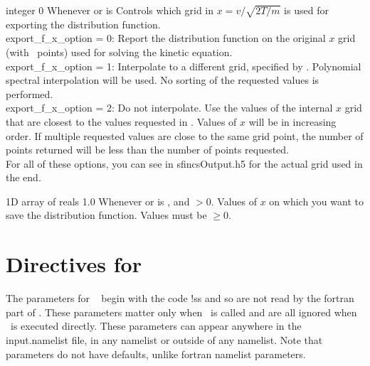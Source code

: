 {integer}
{0}
{Whenever  or  is \true}
{Controls which grid in $x = v/\sqrt{2T/m}$ is used for exporting the distribution function.\\

{\ttfamily export\_f\_x\_option} = 0: Report the distribution function on the original $x$ grid (with \Nx~points) used for solving the kinetic equation.\\

{\ttfamily export\_f\_x\_option} = 1: Interpolate to a different grid, specified by .  Polynomial spectral interpolation will be used.
  No sorting of the requested values is performed.\\

{\ttfamily export\_f\_x\_option} = 2: Do not interpolate. Use the values of the internal $x$ grid that are closest to the values requested in .
  Values of $x$ will be in increasing order. If multiple requested values are close to the same grid point, the number of
  points returned will be less than the number of points requested.\\

For all of these options, you can see  in {\ttfamily sfincsOutput.h5} for the actual grid used in the end.
}

\myhrule

{1D array of reals}
{1.0}
{Whenever  or  is \true, and  $>0$.}
{Values of $x$ on which you want to save the distribution function.  Values must be $\ge 0$.}




















\section{Directives for \sfincsScan}
\label{sec:sfincsScanParams}

The parameters for \sfincsScan~ begin with the code {\ttfamily !ss} and so are not read by the fortran part of \sfincs.
These parameters matter only when \sfincsScan~is called and are all ignored when \sfincs~is executed directly.
These parameters can appear anywhere in the {\ttfamily input.namelist} file, in any namelist or outside of any namelist.
Note that \sfincsScan~ parameters do not have defaults, unlike fortran namelist parameters.\\


